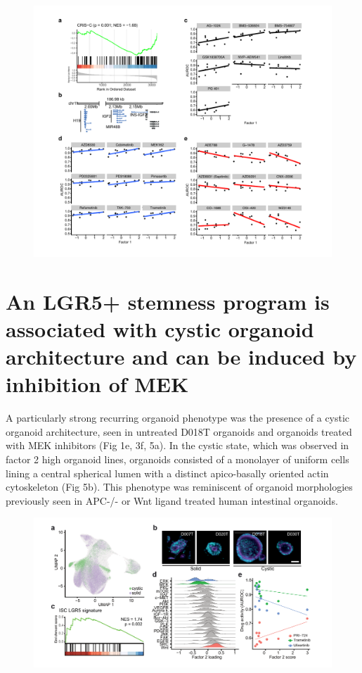 \begin{flushleft}
\begin{figure}[h]
\centering
\includegraphics[width=\textwidth,
                height=\textheight,
                keepaspectratio]{figures/promise/pdf/fig_6_2.pdf}
\caption{}
\label{fig_262}
\end{figure}
\bigbreak



\section{An LGR5+ stemness program is associated with cystic organoid architecture and can be induced by inhibition of MEK}

A particularly strong recurring organoid phenotype was the presence of a cystic organoid architecture, seen in untreated D018T organoids and organoids treated with MEK inhibitors (Fig 1e, 3f, 5a). In the cystic state, which was observed in factor 2 high organoid lines, organoids consisted of a monolayer of uniform cells lining a central spherical lumen with a distinct apico-basally oriented actin cytoskeleton (Fig 5b). This phenotype was reminiscent of organoid morphologies previously seen in APC-/- or Wnt ligand treated human intestinal organoids. 

\begin{figure}[h]
\centering
\includegraphics[width=\textwidth,
                height=\textheight,
                keepaspectratio]{figures/promise/pdf/fig_5_1.pdf}
\caption{}
\label{fig_251}
\end{figure}
\bigbreak


\end{flushleft}
